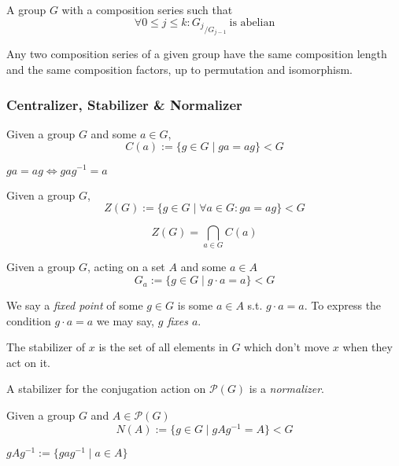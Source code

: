 \begin{definition}
   A group \(G\) with a composition series such that
   \[\forall 0 \leq j \leq k: {G_j}_{/G_{j-1}}~\text{is abelian}\]
\end{definition}

\begin{theorem}
   Any two composition series of a given group have the same composition length and the same composition factors, up to permutation and isomorphism.
\end{theorem}

\subsubsection{Centralizer, Stabilizer \& Normalizer}
\begin{definition}[Centralizer]
   Given a group \(G\) and some \(a \in G\),
   \[C(a) := \{g \in G \mid ga = ag\} < G\]
\end{definition}
\begin{remark}
   \(ga = ag \iff gag^{-1} = a\)
\end{remark}

\begin{definition}[Center]
   Given a group \(G\),
   \[Z(G) := \{g \in G \mid \forall a \in G: ga = ag\} < G\]
\end{definition}
\begin{remark}
   \[Z(G) = \bigcap_{a \in G} C(a)\]
\end{remark}

\begin{definition}[Stabilizer]
   Given a group \(G\), acting on a set \(A\) and some \(a \in A\)
   \[G_a := \{g \in G \mid g \cdot a = a\} < G\]
\end{definition}
\begin{remark}[Terminology]
   We say a \emph{fixed point} of some \(g \in G\) is some \(a \in A\) s.t. \(g \cdot a = a\).
   To express the condition \(g \cdot a = a\) we may say, \emph{\(g\) fixes \(a\)}.
\end{remark}
\begin{remark}[Intuition]
   The stabilizer of \(x\) is the set of all elements in \(G\) which don't move \(x\) when they act on it.
\end{remark}

A stabilizer for the conjugation action on \(\mathcal{P}(G)\) is a \emph{normalizer}.

\begin{definition}[Normalizer]
   Given a group \(G\) and \(A \in \mathcal{P}(G)\)
   \[N(A) := \{g \in G \mid gAg^{-1} = A\} < G\]
\end{definition}
\begin{remark}
   \(gAg^{-1} := \{gag^{-1} \mid a \in A\}\)
\end{remark}

